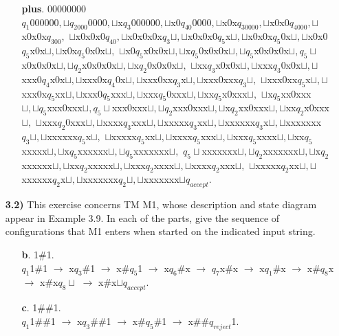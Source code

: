\documentclass[12pt]{letter}
\begin{document}
\begin{enumerate}
\begin{enumerate}
	\item[\textbf{plus}.] 00000000 \\
		$q_1 0000 00, \sqcup q_2000 0000, \sqcup$x$q_3 00 0000, \sqcup$x$0 q_40 0000, \sqcup$x0x$q_30000, \sqcup$x0x0$q_4000, \sqcup$x0x0x$q_300,$
		$\sqcup$x0x0x0$q_40, \sqcup$x0x0x0x$q_3\sqcup, \sqcup$x0x0x0$q_5$x$\sqcup,\sqcup$x0x0x$q_5$0x$\sqcup, \sqcup$x0x0$q_5$x0x$\sqcup,\sqcup$x0x$q_5$0x0x$\sqcup,$
		$\sqcup$x0$q_5$x0x0x$\sqcup, \sqcup$x$q_5$0x0x0x$\sqcup, \sqcup q_5$x0x0x0x$\sqcup, q_5 \sqcup$x0x0x0x$\sqcup, \sqcup q_2$x0x0x0x$\sqcup, \sqcup$x$q_2$0x0x0x$\sqcup,$
		$\sqcup$xx$q_3$x0x0x$\sqcup, \sqcup$xxx$q_3$0x0x$\sqcup,\sqcup$xxx0$q_4$x0x$\sqcup, \sqcup$xxx0x$q_4$0x$\sqcup, \sqcup$xxx0xx$q_3$x$\sqcup, \sqcup$xxx0xxx$q_3\sqcup,$
		$\sqcup$xxx0xx$q_5$x$\sqcup,\sqcup$ xxx0x$q_5$xx$\sqcup, \sqcup$xxx0$q_5$xxx$\sqcup,\sqcup$xxx$q_5$0xxx$\sqcup, \sqcup$xx$q_5$x0xxx$\sqcup,$
		$\sqcup$x$q_5$xx0xxx$\sqcup,\sqcup q_5$xxx0xxx$\sqcup, q_5 \sqcup$xxx0xxx$\sqcup, \sqcup q_2$xxx0xxx$\sqcup,\sqcup$x$q_2$xx0xxx$\sqcup, \sqcup$xx$q_2$x0xxx$\sqcup,$
		$\sqcup$xxx$q_2$0xxx$\sqcup, \sqcup$xxxx$q_3$xxx$\sqcup,\sqcup$xxxxx$q_3$xx$\sqcup, \sqcup$xxxxxx$q_3$x$\sqcup,\sqcup$xxxxxxx$q_3 \sqcup, \sqcup$xxxxxx$q_5$x$\sqcup,$
		$\sqcup$xxxxx$q_5$xx$\sqcup,\sqcup$xxxx$q_5$xxx$\sqcup,\sqcup$xxx$q_5$xxxx$\sqcup,\sqcup$xx$q_5$xxxxx$\sqcup, \sqcup$x$q_5$xxxxxx$\sqcup,\sqcup q_5$xxxxxxx$\sqcup,$
		$q_5 \sqcup$xxxxxxx$\sqcup,\sqcup q_2$xxxxxxx$\sqcup,\sqcup$x$q_2$xxxxxx$\sqcup,\sqcup$xx$q_2$xxxxx$\sqcup, \sqcup$xxx$q_2$xxxx$\sqcup,\sqcup$xxxx$q_2$xxx$\sqcup,$
		$\sqcup$xxxxx$q_2$xx$\sqcup,\sqcup$xxxxxx$q_2$x$\sqcup,\sqcup$xxxxxxx$q_2\sqcup,\sqcup$xxxxxxx$\sqcup q_{accept}.$
\end{enumerate}

\item[\textbf{3.2)}]This exercise concerns TM M1, whose description and state diagram appear in Example 3.9. In each of the parts, give the sequence of configurations that M1 enters when started on the indicated input string.
\begin{enumerate}
	\item[\textbf{b}.] 1\#1. \\
	$q_1$1\#1 $\rightarrow$ x$q_3$\#1 $\rightarrow$ x\#$q_5$1 $\rightarrow$ x$q_6$\#x $\rightarrow$ $q_7$x\#x $\rightarrow$ x$q_1$\#x $\rightarrow$ x\#$q_8$x $\rightarrow$ x\#x$q_8\sqcup$ $\rightarrow$ x\#x$\sqcup q_{accept}.$

	\item[\textbf{c}.] 1\#\#1. \\
	$q_1$1\#\#1 $\rightarrow$ x$q_3$\#\#1 $\rightarrow$ x\#$q_5$\#1 $\rightarrow$ x\#\#$q_{reject}$1.


\end{enumerate}
\end{enumerate}
\end{document}
